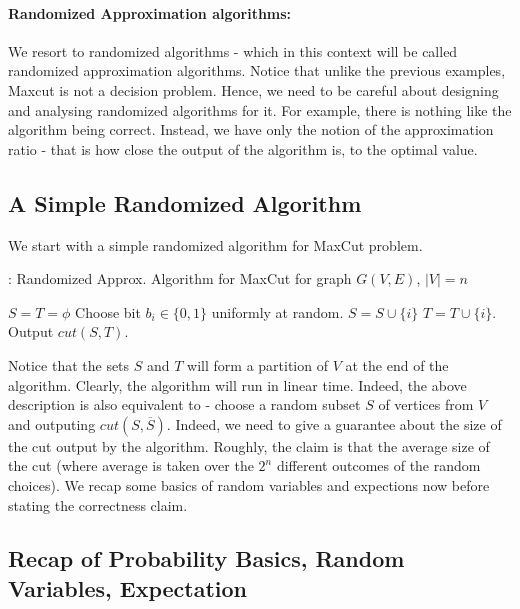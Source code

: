 \paragraph*{Randomized Approximation algorithms: }
We resort to randomized algorithms - which in this context will be called randomized approximation algorithms. Notice that unlike the previous examples, {\sc Maxcut} is not a decision problem. Hence, we need to be careful about designing and analysing randomized algorithms for it. For example, there is nothing like the algorithm being correct. Instead, we have only the notion of the approximation ratio - that is how close the output of the algorithm is, to the optimal value.

\subsection{A Simple Randomized Algorithm} We start with a simple randomized algorithm for {\sc MaxCut} problem.

\begin{algorithm}%
\label{alg:maxcut-rand}
\caption{: Randomized Approx. Algorithm for {\sc MaxCut} for graph $G(V,E)$, $|V| = n$}
\begin{algorithmic}[1]
\State $S = T = \phi$
\State Choose bit $b_i \in \{0,1\}$ uniformly at random.
\State $S = S \cup \{i\}$
\Else
\State $T = T \cup \{i\}$.
\EndIf
\EndFor
\State Output $cut(S,T)$.
\end{algorithmic}
\end{algorithm}

Notice that the sets $S$ and $T$ will form a partition of $V$ at the end of the algorithm. Clearly, the algorithm will run in linear time. Indeed, the above description is also equivalent to - choose a random subset $S$ of vertices from $V$ and outputing $cut(S,\overline{S})$. Indeed, we need to give a guarantee about the size of the cut output by the algorithm. Roughly, the claim is that the average size of the cut (where average is taken over the $2^n$ different outcomes of the random choices). We recap some basics of random variables and expections now before stating the correctness claim.

\subsection{Recap of Probability Basics, Random Variables, Expectation}

